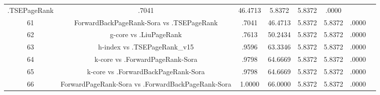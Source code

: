 \documentclass[a4paper,10pt]{article}
\begin{document}
\begin{landscape}
\begin{table}[!htp]
\begin{tabular}{cccccccc}
.TSEPageRank&.7041&46.4713&5.8372&5.8372&.0000\\61&ForwardBackPageRank-Sora vs .TSEPageRank&.7041&46.4713&5.8372&5.8372&.0000\\62&g-core vs .LiuPageRank&.7613&50.2434&5.8372&5.8372&.0000\\63&h-index vs .TSEPageRank_v15&.9596&63.3346&5.8372&5.8372&.0000\\64&k-core vs .ForwardPageRank-Sora&.9798&64.6669&5.8372&5.8372&.0000\\65&k-core vs .ForwardBackPageRank-Sora&.9798&64.6669&5.8372&5.8372&.0000\\66&ForwardPageRank-Sora vs .ForwardBackPageRank-Sora&1.0000&66.0000&5.8372&5.8372&.0000\\\hline
\end{tabular}
\end{table}

\end{landscape}
\end{document}
